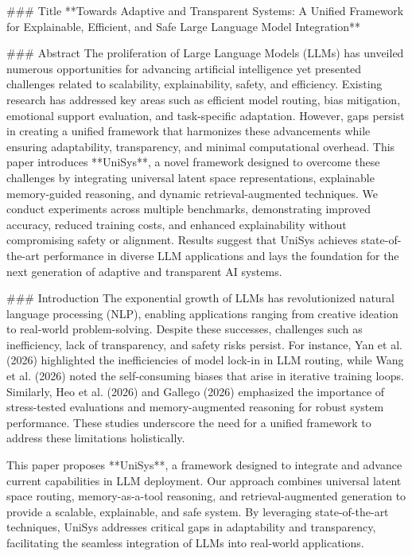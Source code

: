### Title  
**Towards Adaptive and Transparent Systems: A Unified Framework for Explainable, Efficient, and Safe Large Language Model Integration**

### Abstract  
The proliferation of Large Language Models (LLMs) has unveiled numerous opportunities for advancing artificial intelligence yet presented challenges related to scalability, explainability, safety, and efficiency. Existing research has addressed key areas such as efficient model routing, bias mitigation, emotional support evaluation, and task-specific adaptation. However, gaps persist in creating a unified framework that harmonizes these advancements while ensuring adaptability, transparency, and minimal computational overhead. This paper introduces **UniSys**, a novel framework designed to overcome these challenges by integrating universal latent space representations, explainable memory-guided reasoning, and dynamic retrieval-augmented techniques. We conduct experiments across multiple benchmarks, demonstrating improved accuracy, reduced training costs, and enhanced explainability without compromising safety or alignment. Results suggest that UniSys achieves state-of-the-art performance in diverse LLM applications and lays the foundation for the next generation of adaptive and transparent AI systems.

### Introduction  
The exponential growth of LLMs has revolutionized natural language processing (NLP), enabling applications ranging from creative ideation to real-world problem-solving. Despite these successes, challenges such as inefficiency, lack of transparency, and safety risks persist. For instance, Yan et al. (2026) highlighted the inefficiencies of model lock-in in LLM routing, while Wang et al. (2026) noted the self-consuming biases that arise in iterative training loops. Similarly, Heo et al. (2026) and Gallego (2026) emphasized the importance of stress-tested evaluations and memory-augmented reasoning for robust system performance. These studies underscore the need for a unified framework to address these limitations holistically.

This paper proposes **UniSys**, a framework designed to integrate and advance current capabilities in LLM deployment. Our approach combines universal latent space routing, memory-as-a-tool reasoning, and retrieval-augmented generation to provide a scalable, explainable, and safe system. By leveraging state-of-the-art techniques, UniSys addresses critical gaps in adaptability and transparency, facilitating the seamless integration of LLMs into real-world applications.

